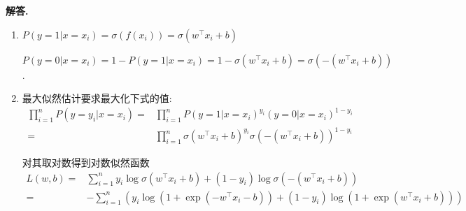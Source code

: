 \documentclass[11pt]{article}
\newenvironment{solution}{\par\noindent\textbf{解答. }}{\par}
\begin{document}
	\section{}
	\begin{solution}
		\begin{enumerate}[(1)]
			\item $P(y=1|x=x_i)=\sigma(f(x_i))=\sigma(w^\top x_i+b)$
			
			$P(y=0|x=x_i)=1-P(y=1|x=x_i)=1-\sigma(w^\top x_i+b)=\sigma(-(w^\top x_i+b))$.

			\item 最大似然估计要求最大化下式的值: $$\begin{aligned} 
				\prod_{i=1}^n P(y=y_i|x=x_i)=&\prod_{i=1}^n P(y=1|x=x_i)^{y_i} (y=0|x=x_i)^{1-y_i}\\
				=&\prod_{i=1}^n\sigma(w^\top x_i+b)^{y_i}\sigma(-(w^\top x_i+b))^{1-y_i}
			\end{aligned}$$

			对其取对数得到对数似然函数
			$$\begin{aligned}
				L(w,b)=&\sum_{i=1}^n y_i\log\sigma(w^\top x_i+b)+(1-y_i)\log\sigma(-(w^\top x_i+b))\\
				=&-\sum_{i=1}^n\left(y_i\log(1+\exp(-w^\top x_i-b))+(1-y_i)\log(1+\exp(w^\top x_i+b))\right)
			\end{aligned}$$
		\end{enumerate}
	\end{solution}
\end{document}
